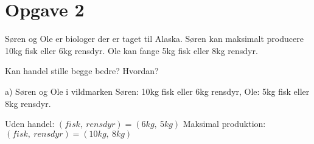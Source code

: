 \section{Opgave 2}

\begin{frame}
Søren og Ole er biologer der er taget til Alaska. Søren kan maksimalt producere 10kg fisk eller 6kg rensdyr. Ole kan fange 5kg fisk eller 8kg rensdyr.

Kan handel stille begge bedre? Hvordan? 
\end{frame}

\begin{frame}{a) Søren og Ole i vildmarken}
Søren: 10kg fisk eller 6kg rensdyr, Ole: 5kg fisk eller 8kg rensdyr.

Uden handel: $(fisk, \ rensdyr) = (6kg, \ 5kg)$
Maksimal produktion: $(fisk, \ rensdyr) = (10kg, \ 8kg)$



\end{frame}
